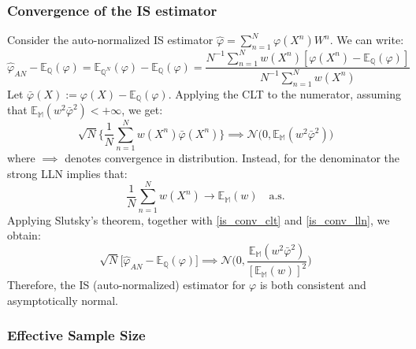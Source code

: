 \documentclass[
]{book}
\theoremstyle{break}
\theoremstyle{nonumberplain}
\begin{document}
\subsubsection{Convergence of the IS estimator}\label{pf_is_conv}

Consider the auto-normalized IS estimator
\(\hat \varphi= \sum_{n=1}^N\varphi (X^n)W^n\). We can write:
\begin{equation*}
   \hat \varphi_{AN} - \mathbb E_{\mathbb Q}(\varphi)=\mathbb E_{\mathbb Q^N}(\varphi)-\mathbb E_{\mathbb Q}(\varphi)=\frac{N^{-1}\sum_{n=1}^Nw(X^n)[\varphi(X^n)-\mathbb E_{\mathbb Q}(\varphi)]}{N^{-1}\sum_{n=1}^Nw(X^n)}
\end{equation*} Let
\(\bar \varphi(X):=\varphi(X)-\mathbb E_{\mathbb Q}(\varphi)\). Applying
the CLT to the numerator, assuming that
\(\mathbb E_{\mathbb M}(w^2\bar\varphi^2)<+\infty\), we get:
\begin{equation}
    \sqrt{N}\Bigg\{\frac{1}{N}\sum_{n=1}^Nw(X^n)\bar \varphi (X^n)\Bigg\}\implies \mathcal N\big(0,\mathbb E_{\mathbb M}(w^2\bar\varphi^2)\big)\label{is_conv_clt}
\end{equation} where \(\implies\) denotes convergence in distribution.
Instead, for the denominator the strong LLN implies that:
\begin{equation}
    \frac{1}{N}\sum_{n=1}^Nw(X^n)\rightarrow \mathbb E_{\mathbb M}(w) ~~~\text{ a.s.}\label{is_conv_lln}
\end{equation} Applying Slutsky's theorem, together with
\eqref{is_conv_clt} and \eqref{is_conv_lln}, we obtain: \begin{equation}
   \sqrt{N}\big[  \hat \varphi_{AN} - \mathbb E_{\mathbb Q}(\varphi)\big] \implies \mathcal N\Bigg(0,\frac{\mathbb E_{\mathbb M}(w^2\bar\varphi^2)}{[\mathbb E_{\mathbb M}(w)]^2}\Bigg)
\end{equation} Therefore, the IS (auto-normalized) estimator for
\(\varphi\) is both consistent and asymptotically normal.

\subsubsection{Effective Sample Size}
\end{document}
